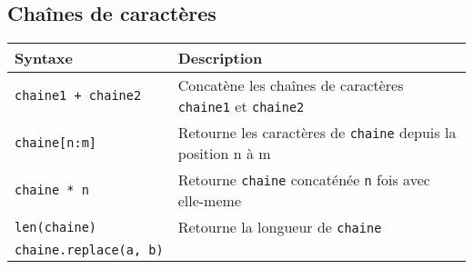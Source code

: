 \documentclass[]{article}
\begin{document}
\hypertarget{chauxeenes-de-caractuxe8res}{%
\subsection{Chaînes de caractères}\label{chauxeenes-de-caractuxe8res}}

\begin{longtable}[]{@{}ll@{}}
\toprule
\begin{minipage}[b]{0.20\columnwidth}\raggedright
Syntaxe\strut
\end{minipage} & \begin{minipage}[b]{0.74\columnwidth}\raggedright
Description\strut
\end{minipage}\tabularnewline
\midrule
\endhead
\begin{minipage}[t]{0.20\columnwidth}\raggedright
\texttt{chaine1\ +\ chaine2}\strut
\end{minipage} & \begin{minipage}[t]{0.74\columnwidth}\raggedright
Concatène les chaînes de caractères \texttt{chaine1} et
\texttt{chaine2}\strut
\end{minipage}\tabularnewline
\begin{minipage}[t]{0.20\columnwidth}\raggedright
\texttt{chaine{[}n:m{]}}\strut
\end{minipage} & \begin{minipage}[t]{0.74\columnwidth}\raggedright
Retourne les caractères de \texttt{chaine} depuis la position n à
m\strut
\end{minipage}\tabularnewline
\begin{minipage}[t]{0.20\columnwidth}\raggedright
\texttt{chaine\ *\ n}\strut
\end{minipage} & \begin{minipage}[t]{0.74\columnwidth}\raggedright
Retourne \texttt{chaine} concaténée \texttt{n} fois avec elle-meme\strut
\end{minipage}\tabularnewline
\begin{minipage}[t]{0.20\columnwidth}\raggedright
\texttt{len(chaine)}\strut
\end{minipage} & \begin{minipage}[t]{0.74\columnwidth}\raggedright
Retourne la longueur de \texttt{chaine}\strut
\end{minipage}\tabularnewline
\begin{minipage}[t]{0.20\columnwidth}\raggedright
\texttt{chaine.replace(a,\ b)}\strut
\end{minipage} & \begin{minipage}[t]{0.74\columnwidth}\raggedright

\end{minipage}
\end{longtable}
\end{document}
